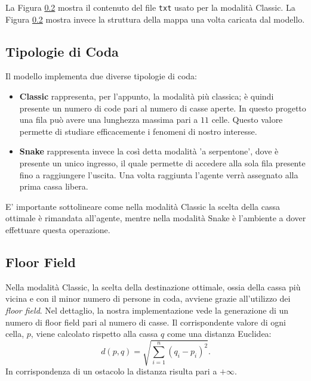 La Figura \ref{} mostra il contenuto del file \lstinline{txt} usato per la modalità Classic. La Figura \ref{} mostra invece la struttura della mappa una volta caricata dal modello.

\subsection{Tipologie di Coda}
Il modello implementa due diverse tipologie di coda:
\begin{itemize}
    \item \textbf{Classic} rappresenta, per l'appunto, la modalità più classica; è quindi presente un numero di code pari al numero di casse aperte. 
    In questo progetto una fila può avere una lunghezza massima pari a $11$ celle. 
    Questo valore permette di studiare efficacemente i fenomeni di nostro interesse. 
    \item \textbf{Snake} rappresenta invece la così detta modalità 'a serpentone', dove è presente un unico ingresso, il quale permette di accedere alla sola fila presente fino a raggiungere l'uscita. 
    Una volta raggiunta l'agente verrà assegnato alla prima cassa libera.
\end{itemize}
E' importante sottolineare come nella modalità Classic la scelta della cassa ottimale è rimandata all'agente, mentre nella modalità Snake è l'ambiente a dover effettuare questa operazione.

\subsection{Floor Field}
Nella modalità Classic, la scelta della destinazione ottimale, ossia della cassa più vicina e con il minor numero di persone in coda, avviene grazie all'utilizzo dei \textit{floor field}.
Nel dettaglio, la nostra implementazione vede la generazione di un numero di floor field pari al numero di casse. 
Il corrispondente valore di ogni cella, $p$, viene calcolato rispetto alla cassa $q$ come una distanza Euclidea:
\begin{equation*}
d\left(p, q\right) = \sqrt {\sum _{i=1}^{n}  \left( q_{i}-p_{i}\right)^2 }.
\end{equation*}
In corrispondenza di un ostacolo la distanza risulta pari a $+ \infty$.


